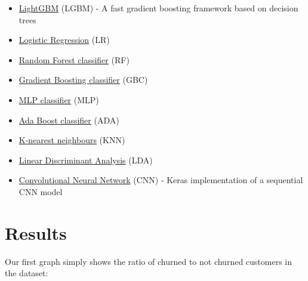 \documentclass[]{article}
\begin{document}
\begin{itemize}
	\item \href{https://github.com/microsoft/LightGBM}{LightGBM} (LGBM) - A fast gradient boosting framework based on decision trees
	\item \href{https://scikit-learn.org/stable/modules/generated/sklearn.linear_model.LogisticRegression.html}{Logistic Regression} (LR)
	\item \href{https://scikit-learn.org/stable/modules/generated/sklearn.ensemble.RandomForestClassifier.html}{Random Forest classifier} (RF)
	\item \href{https://scikit-learn.org/stable/modules/generated/sklearn.ensemble.GradientBoostingClassifier.html}{Gradient Boosting classifier} (GBC)
	\item \href{https://scikit-learn.org/stable/modules/generated/sklearn.neural_network.MLPClassifier.html}{MLP classifier} (MLP)
	\item \href{https://scikit-learn.org/stable/modules/generated/sklearn.ensemble.AdaBoostClassifier.html}{Ada Boost classifier} (ADA)
	\item \href{https://scikit-learn.org/stable/modules/generated/sklearn.neighbors.KNeighborsClassifier.html}{K-nearest neighbours} (KNN)
	\item \href{https://scikit-learn.org/stable/modules/generated/sklearn.discriminant_analysis.LinearDiscriminantAnalysis.html}{Linear Discriminant Analysis} (LDA)
	\item \href{https://keras.io/api/models/sequential/#sequential-class}{Convolutional Neural Network} (CNN) - Keras implementation of a sequential CNN model
\end{itemize}

\newpage

\section{Results}

Our first graph simply shows the ratio of churned to not churned customers in the dataset:
\end{document}
